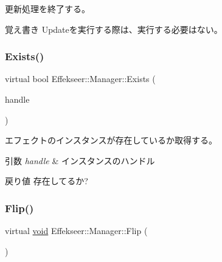 更新処理を終了する。 

\begin{DoxyNote}{覚え書き}
Updateを実行する際は、実行する必要はない。 
\end{DoxyNote}
\mbox{\label{class_effekseer_1_1_manager_ad95297e9170c9f9874eb6bf951aa5dc0}} 
\subsubsection{\texorpdfstring{Exists()}{Exists()}}
{\footnotesize\ttfamily virtual bool Effekseer\+::\+Manager\+::\+Exists (\begin{DoxyParamCaption}\item[{\mbox{\hyperlink{namespace_effekseer_afba58b8d812da862190e9bbfc040824a}{Handle}}}]{handle }\end{DoxyParamCaption})\hspace{0.3cm}{\ttfamily [pure virtual]}}



エフェクトのインスタンスが存在しているか取得する。 


\begin{DoxyParams}{引数}
{\em handle} & インスタンスのハンドル \\
\hline
\end{DoxyParams}
\begin{DoxyReturn}{戻り値}
存在してるか? 
\end{DoxyReturn}
\mbox{\label{class_effekseer_1_1_manager_ab810f714df5d12c566664183f365cbf4}} 
\subsubsection{\texorpdfstring{Flip()}{Flip()}}
{\footnotesize\ttfamily virtual \mbox{\hyperlink{namespace_effekseer_ab34c4088e512200cf4c2716f168deb56}{void}} Effekseer\+::\+Manager\+::\+Flip (\begin{DoxyParamCaption}{ }\end{DoxyParamCaption})\hspace{0.3cm}{\ttfamily [pure virtual]}}



